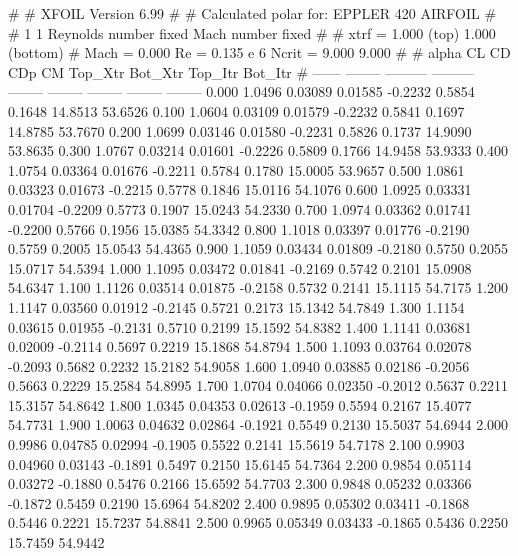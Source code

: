 #  
#       XFOIL         Version 6.99
#  
# Calculated polar for: EPPLER 420 AIRFOIL                              
#  
# 1 1 Reynolds number fixed          Mach number fixed         
#  
# xtrf =   1.000 (top)        1.000 (bottom)  
# Mach =   0.000     Re =     0.135 e 6     Ncrit =   9.000  9.000
#  
#   alpha    CL        CD       CDp       CM     Top_Xtr  Bot_Xtr  Top_Itr  Bot_Itr
#  ------ -------- --------- --------- -------- -------- -------- -------- --------
   0.000   1.0496   0.03089   0.01585  -0.2232   0.5854   0.1648  14.8513  53.6526
   0.100   1.0604   0.03109   0.01579  -0.2232   0.5841   0.1697  14.8785  53.7670
   0.200   1.0699   0.03146   0.01580  -0.2231   0.5826   0.1737  14.9090  53.8635
   0.300   1.0767   0.03214   0.01601  -0.2226   0.5809   0.1766  14.9458  53.9333
   0.400   1.0754   0.03364   0.01676  -0.2211   0.5784   0.1780  15.0005  53.9657
   0.500   1.0861   0.03323   0.01673  -0.2215   0.5778   0.1846  15.0116  54.1076
   0.600   1.0925   0.03331   0.01704  -0.2209   0.5773   0.1907  15.0243  54.2330
   0.700   1.0974   0.03362   0.01741  -0.2200   0.5766   0.1956  15.0385  54.3342
   0.800   1.1018   0.03397   0.01776  -0.2190   0.5759   0.2005  15.0543  54.4365
   0.900   1.1059   0.03434   0.01809  -0.2180   0.5750   0.2055  15.0717  54.5394
   1.000   1.1095   0.03472   0.01841  -0.2169   0.5742   0.2101  15.0908  54.6347
   1.100   1.1126   0.03514   0.01875  -0.2158   0.5732   0.2141  15.1115  54.7175
   1.200   1.1147   0.03560   0.01912  -0.2145   0.5721   0.2173  15.1342  54.7849
   1.300   1.1154   0.03615   0.01955  -0.2131   0.5710   0.2199  15.1592  54.8382
   1.400   1.1141   0.03681   0.02009  -0.2114   0.5697   0.2219  15.1868  54.8794
   1.500   1.1093   0.03764   0.02078  -0.2093   0.5682   0.2232  15.2182  54.9058
   1.600   1.0940   0.03885   0.02186  -0.2056   0.5663   0.2229  15.2584  54.8995
   1.700   1.0704   0.04066   0.02350  -0.2012   0.5637   0.2211  15.3157  54.8642
   1.800   1.0345   0.04353   0.02613  -0.1959   0.5594   0.2167  15.4077  54.7731
   1.900   1.0063   0.04632   0.02864  -0.1921   0.5549   0.2130  15.5037  54.6944
   2.000   0.9986   0.04785   0.02994  -0.1905   0.5522   0.2141  15.5619  54.7178
   2.100   0.9903   0.04960   0.03143  -0.1891   0.5497   0.2150  15.6145  54.7364
   2.200   0.9854   0.05114   0.03272  -0.1880   0.5476   0.2166  15.6592  54.7703
   2.300   0.9848   0.05232   0.03366  -0.1872   0.5459   0.2190  15.6964  54.8202
   2.400   0.9895   0.05302   0.03411  -0.1868   0.5446   0.2221  15.7237  54.8841
   2.500   0.9965   0.05349   0.03433  -0.1865   0.5436   0.2250  15.7459  54.9442
